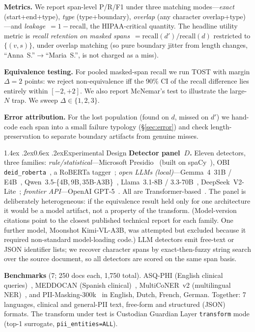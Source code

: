 \documentclass[11pt]{article}
\makeatletter
\renewcommand\section{\@startsection{section}{1}{\z@}%
  {1.4ex \@plus.2ex}{0.6ex \@plus.2ex}{\normalfont\large\bfseries}}
\newcommand{\tp}[1]{\texttt{#1}}
\makeatother
\begin{document}
\textbf{Metrics.} We report span-level P/R/F1 under three matching modes---\emph{exact} (start+end+type), \emph{type} (type+boundary), \emph{overlap} (any character overlap+type)---and \emph{leakage}~$=1-\text{recall}$, the HIPAA-critical quantity. The headline utility metric is \emph{recall retention on masked spans}~$=\text{recall}(d')/\text{recall}(d)$ restricted to $\{(v,s)\}$, under overlap matching (so pure boundary jitter from length changes, ``Anna~S.''$\rightarrow$``Maria~S.'', is not charged as a miss).

\textbf{Equivalence testing.} For pooled masked-span recall we run TOST with margin $\Delta=2$ points: we reject non-equivalence iff the 90\% CI of the recall difference lies entirely within $[-2,+2]$. We also report McNemar's test to illustrate the large-$N$ trap. We sweep $\Delta\in\{1,2,3\}$.

\textbf{Error attribution.} For the lost population (found on $d$, missed on $d'$) we hand-code each span into a small failure typology (\S\ref{sec:error}) and check length-preservation to separate boundary artifacts from genuine misses.

\section{Experimental Design}\label{sec:design}
\textbf{Detector panel~$D$.} Eleven detectors, three families: \emph{rule/statistical}---Microsoft Presidio~\citep{presidio} (built on spaCy~\citep{spacy}), OBI \tp{deid\_roberta}~\citep{johnson2020deid}, a RoBERTa tagger~\citep{liu2019roberta,devlin2019bert}; \emph{open LLMs (local)}---Gemma~4~31B / E4B~\citep{gemma2report}, Qwen~3.5-\{4B,\,9B,\,35B-A3B\}~\citep{qwen25report}, Llama~3.1-8B / 3.3-70B~\citep{llama3herd}, DeepSeek~V2-Lite~\citep{deepseekv2}; \emph{frontier API}---OpenAI GPT-5~\citep{openai2023gpt4}. All are Transformer-based~\citep{vaswani2017attention}. The panel is deliberately heterogeneous: if the equivalence result held only for one architecture it would be a model artifact, not a property of the transform. (Model-version citations point to the closest published technical report for each family. One further model, Moonshot Kimi-VL-A3B, was attempted but excluded because it required non-standard model-loading code.) LLM detectors emit free-text or JSON identifier lists; we recover character spans by exact-then-fuzzy string search over the source document, so all detectors are scored on the same span basis.

\textbf{Benchmarks} (7; 250 docs each, 1{,}750 total). ASQ-PHI (English clinical queries)~\citep{weatherhead2026asqphi}, MEDDOCAN (Spanish clinical)~\citep{marimon2019meddocan}, MultiCoNER~v2 (multilingual NER)~\citep{malmasi2022multiconer,fetahu2023multiconer}, and PII-Masking-300k~\citep{ai4privacy2023} in English, Dutch, French, German. Together: 7 languages, clinical and general-PII text, free-form and structured (JSON) formats. The transform under test is Custodian Guardian Layer \tp{transform} mode (top-1 surrogate, \tp{pii\_entities=ALL}).
\end{document}
